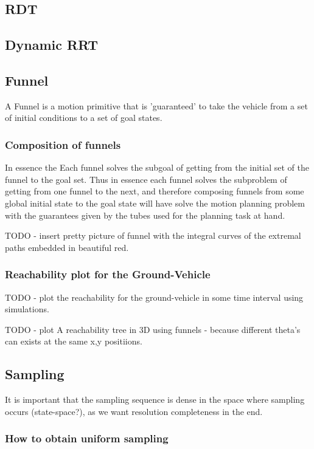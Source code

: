 \subsection{RDT}


\subsection{Dynamic RRT}

\subsection{Funnel}

A Funnel is a motion primitive that is 'guaranteed' to take the vehicle from a
set of initial conditions to a set of goal states. 

\subsubsection{Composition of funnels}

In essence the 
Each funnel solves the subgoal of getting from the initial set of the funnel to
the goal set. Thus in essence each funnel solves the subproblem of getting from
one funnel to the next, and therefore composing funnels from some global initial
state to the goal state will have solve the motion planning problem with the
guarantees given by the tubes used for the planning task at hand.

TODO - insert pretty picture of funnel with the integral curves of the extremal
paths embedded in beautiful red.

\subsubsection{Reachability plot for the Ground-Vehicle}
TODO - plot the reachability for the ground-vehicle in some time interval using
simulations. 

TODO - plot A reachability tree in 3D using funnels - because different theta's
can exists at the same x,y positiions.

\subsection{Sampling}
It is important that the sampling sequence is dense in the space where sampling
occurs (state-space?), as we want resolution completeness in the end.
\subsubsection{How to obtain uniform sampling}
